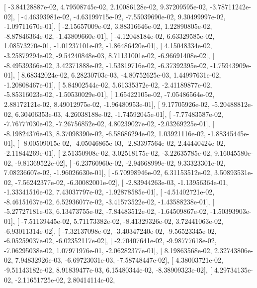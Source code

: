 \documentclass{article}
\begin{document}
       [ -3.84128887e-02,   4.79508745e-02,   2.10086128e-02,
          9.37209595e-02,  -3.78711242e-02],
       [ -4.46393981e-02,  -4.63199715e-02,  -7.55039690e-02,
          9.30499997e-02,  -1.09711670e-01],
       [ -2.15657009e-02,   3.88316646e-02,   1.22890805e-02,
         -8.87846364e-02,  -1.43809660e-01],
       [ -4.12048184e-02,   6.63329585e-02,   1.08573270e-01,
         -1.01237101e-02,  -1.86486420e-01],
       [  4.15048334e-02,  -3.25879294e-02,  -9.54240848e-03,
          8.71131001e-02,  -6.96691408e-02],
       [ -8.49539366e-02,   3.42371888e-02,  -1.53819716e-02,
         -6.37392395e-02,  -1.75943909e-01],
       [  8.68342024e-02,   6.28230703e-03,  -4.80752625e-03,
          1.44997631e-02,  -1.20808467e-01],
       [  5.84902544e-02,   5.61335372e-02,  -2.41189877e-02,
         -5.85316023e-02,  -1.50530029e-01],
       [  1.65422105e-02,  -7.05486564e-02,   2.88172121e-02,
          8.49012975e-02,  -1.96480953e-01],
       [  9.17705926e-02,  -5.20488812e-02,   6.30406353e-03,
          4.26038188e-02,  -1.74592045e-01],
       [ -7.77483587e-02,  -7.76777030e-02,  -7.26756852e-02,
          4.80239027e-02,  -2.03269225e-01],
       [ -8.19824376e-03,   8.37098390e-02,  -6.58686294e-02,
          1.03921116e-02,  -1.88345445e-01],
       [ -8.00509015e-02,  -4.05046865e-03,  -2.83397564e-02,
          2.44440424e-02,  -2.11844269e-01],
       [  2.51350908e-02,   3.02518175e-02,  -3.22635785e-02,
          9.16045580e-02,  -9.81369522e-02],
       [ -6.23760960e-02,  -2.94668999e-02,   9.33323301e-02,
          7.08236607e-02,  -1.96026630e-01],
       [ -6.70998946e-02,   6.31153512e-02,   3.50893531e-02,
         -7.56242377e-02,  -6.30082001e-02],
       [ -2.83944263e-03,  -1.13956364e-01,  -1.33341516e-02,
          7.43037797e-02,  -1.92878585e-01],
       [ -4.51402721e-02,  -8.46151637e-02,   6.52936077e-02,
         -3.41573522e-02,  -1.43588238e-01],
       [ -5.27727181e-03,   6.13473755e-02,  -7.84483512e-02,
         -1.64509867e-02,  -1.50393903e-01],
       [ -7.51139445e-02,   5.71173382e-02,  -8.41329326e-02,
          3.72441063e-02,  -6.93011314e-02],
       [ -7.32137098e-02,  -3.40347240e-02,  -9.56523345e-02,
         -6.05259037e-02,  -6.02352117e-02],
       [ -2.70407641e-02,  -9.98777618e-02,  -7.06295038e-02,
          1.07971976e-01,  -2.06282377e-01],
       [  8.19863568e-02,   2.32743806e-02,   7.94832926e-03,
         -6.69723031e-03,  -7.58748447e-02],
       [  4.38003721e-02,  -9.51143182e-02,   8.91839477e-03,
          6.15480344e-02,  -8.38909323e-02],
       [  4.29734135e-02,  -2.11651725e-02,   2.80414114e-02,
\end{document}
